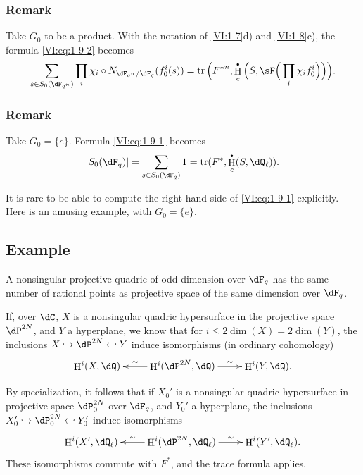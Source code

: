 \documentclass[oneside]{book}
\DeclareMathOperator{\h}{H}
\DeclareMathOperator{\tr}{tr}
\theoremstyle{sga-source}
\theoremstyle{sga-source-dash}
\theoremstyle{sga-source-dotdash}
\theoremstyle{sga-source-number-note-dash}
\theoremstyle{sga-source-note-number-dotdash}
\theoremstyle{sga-source-example-dotdash}
\theoremstyle{sga-source-inline-number}
\theoremstyle{sga-source-bare-number}
\theoremstyle{sga-source}
\let\oldbullet\bullet
\renewcommand{\bullet}{\textnormal{\tiny$\oldbullet$}}
\newcommand{\PrintPage}[1]{}\newcommand{\MathPage}[1]{}\newcommand{\PrintCite}[2]{#1}\newcommand{\var}[3]{#2}
\begin{document}
\addtocounter{subsubsection}{2}
\subsubsection{Remark}\label{VI:1-9-3}

Take $G_0$ to be a product. With the notation of \ref{VI:1-7}d) and 
\ref{VI:1-8}c), the formula \eqref{VI:eq:1-9-2} becomes 
\[
  \sum_{s\in S_0(\dF_{q^n})} \prod_i \chi_i\circ N_{\dF_{q^n}/\dF_q} (f_0^i(s)) = \tr\Big({F^\ast}^n, \h_c^\bullet\Big(S,\sF\Big(\prod_i \chi_i f_0^i\Big)\Big)\Big) \text{.}
\]





\subsubsection{Remark}\label{VI:1-9-4}

Take $G_0=\{e\}$. Formula \eqref{VI:eq:1-9-1} becomes 
\[
  \left|S_0(\dF_q)\right| = \sum_{s\in S_0(\dF_q)} 1 = \tr(F^\ast,\h_c^\bullet(S,\dQ_\ell)) \text{.}
\]

It is rare to be able to compute the right-hand side of 
\eqref{VI:eq:1-9-1} explicitly. Here is an amusing example, with $G_0=\{e\}$. 





\PrintPage{175}
\subsection{Example}\label{VI:1-10}

A nonsingular projective quadric of odd dimension over \texorpdfstring{$\dF_q$}{Fq} has the same number of rational points as projective space of the same dimension over \texorpdfstring{$\dF_q$}{Fq}.

If, over $\dC$, $X$ is a nonsingular quadric hypersurface in 
the projective space $\dP^{2 N}$, and $Y$ a hyperplane, we know that for 
$i\leqslant 2\dim(X)=2\dim(Y)$, the inclusions 
$X\hookrightarrow \dP^{2 N}\hookleftarrow Y$ induce isomorphisms (in 
ordinary cohomology) 
\[\xymatrix{
  \h^i(X,\dQ) 
    & \ar[l]_-\sim \h^i(\dP^{2 N},\dQ) \ar[r]^-\sim 
    & \h^i(Y,\dQ) \text{.}
}\]

By specialization, it follows that if $X_0'$ is a nonsingular quadric 
hypersurface in projective space $\dP_0^{2 N}$ over $\dF_q$, 
and $Y_0'$ a hyperplane, the inclusions 
$X_0'\hookrightarrow \dP_0^{2 N}\hookleftarrow Y_0'$ induce 
isomorphisms 
\[\xymatrix{
  \h^i(X',\dQ_\ell) 
    & \ar[l]_-\sim \h^i(\dP^{2 N},\dQ_\ell) \ar[r]^-\sim 
    & \h^i(Y',\dQ_\ell) \text{.}
}\]
These isomorphisms commute with $F^\ast$, and the trace formula applies. 
\end{document}
